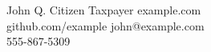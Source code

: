 \documentclass{card}
\begin{document}
    \card
        {John Q. Citizen}
        {Taxpayer}
        {
            example.com\\
            github.com/example
        }
        {
            john@example.com\\
            555-867-5309
        }
\end{document}
